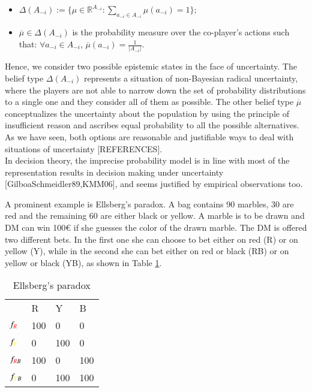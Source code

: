 \documentclass[fleqn,reqno,11pt]{article}
\begin{document}
\begin{itemize}

\item $ \Delta(A_{-i}):=\lbrace \mu \in \mathbb{R}^{A_{-i}}: \sum_{a_{-i} \in A_{-i}} \mu(a_{-i}) = 1 \rbrace$;

\item $\overline{\mu} \in \Delta(A_{-i})$ is the probability measure over the co-player's actions such that: $\forall a_{-i} \in A_{-i}$, $\overline{\mu}(a_{-i})= \frac{1}{|A_{-i}|}$.

\end{itemize} 

Hence, we consider two possible epistemic states in the face of uncertainty. The belief type $\Delta(A_{-i})$ represents a situation of non-Bayesian radical uncertainty, where the players are not able to narrow down the set of probability distributions to a single one and they consider all of them as possible. The other belief type $\overline{\mu}$ conceptualizes the uncertainty about the population by using the principle of insufficient reason and ascribes equal probability to all the possible alternatives. As we have seen, both options are reasonable and justifiable ways to deal with situations of uncertainty [REFERENCES]. \\

In decision theory, the imprecise probability model is in line with most of the representation results in decision making under uncertainty [GilboaSchmeidler89,KMM06], and seems justified by empirical observations too.

A prominent example is Ellsberg's paradox. A bag contains 90 marbles, 30 are red and the remaining 60 are either black or yellow. A marble is to be drawn and DM can win 100€ if she guesses the color of the drawn marble. The DM is offered two different bets. In the first one she can choose to bet either on red (R) or on yellow (Y), while in the second she can bet either on red or black (RB) or on yellow or black (YB), as shown in Table \ref{Ellsberg}.



\begin{table}[h]
\centering
\begin{tabular}{@{}llll@{}}
\cmidrule(l){2-4}
\multicolumn{1}{c}{} & {\color{red}R}   & {\color{yellow}Y}   & B   \\ \cmidrule(l){2-4} 
$f_{{\color{red}R}}$              & 100 & 0   & 0   \\
$f_{{\color{yellow}Y}}$              & 0   & 100 & 0   \\
$f_{{\color{red}R}B}$            & 100 & 0   & 100 \\
$f_{{\color{yellow}Y}B}$             & 0   & 100 & 100 \\ \bottomrule
\end{tabular}
\caption{Ellsberg's paradox}
\label{Ellsberg}
\end{table}
\end{document}
